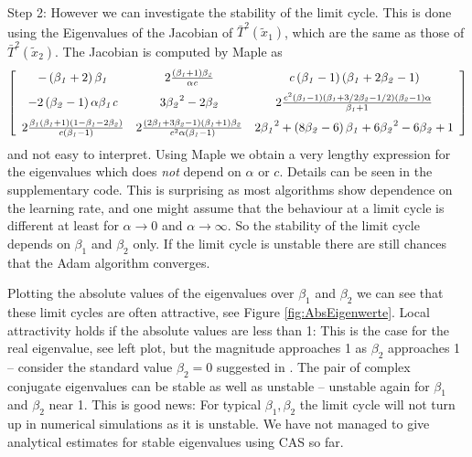 \documentclass[runningheads]{llncs}
\begin{document}
Step 2:
However we can investigate the stability of the limit cycle. This is done using
the Eigenvalues of the Jacobian of $\bar T^2(\tilde x_1)$, which are the same 
as those of $\bar T^2(\tilde x_2)$.
The Jacobian is computed by Maple as
\[
 \left[ \begin {array}{ccc} 
  - \left( {\it \beta_1}+2 \right) {\it \beta_1}&2{
\frac { \left( {\it \beta_1}+1 \right) {\it \beta_2}}{{\it \alpha}{\it c}}}&{\it 
c} \left( {\it \beta_1}-1 \right)  \left( {\it \beta_1}+2{\it \beta_2}-1
 \right) \\ \noalign{\medskip}-2 \left( {\it \beta_2}-1 \right) {\it \alpha}
{\it \beta_1}{\it c}&3{{\it \beta_2}}^{2}-2{\it \beta_2}&2{\frac {{{\it c
}}^{2} \left( {\it \beta_1}-1 \right)  \left( {\it \beta_1}+3/2{\it \beta_2}-1/2
 \right)  \left( {\it \beta_2}-1 \right) {\it \alpha}}{{\it \beta_1}+1}}
\\ \noalign{\medskip}2{\frac {{\it \beta_1} \left( {\it \beta_1}+1 \right) 
 \left( 1 - {\it \beta_1}-2{\it \beta_2} \right) }{{\it c} \left( {\it \beta_1}-1
 \right) }}&2{\frac { \left( 2{\it \beta_1}+3{\it \beta_2}-1 \right) 
 \left( {\it \beta_1}+1 \right) {\it \beta_2}}{{{\it c}}^{2}{\it \alpha} \left( {
\it \beta_1}-1 \right) }}&2{{\it \beta_1}}^{2}+ \left( 8{\it \beta_2}-6 \right) {
\it \beta_1}+6 {{\it \beta_2}}^{2}-6{\it \beta_2}+1
\end {array} \right] 
\]
and not easy to interpret.  
Using Maple we obtain a very lengthy expression for the eigenvalues which does 
{\em not} depend on $\alpha$ or $c$. Details can be seen in the supplementary code.
This is surprising as most algorithms show dependence on the learning rate,
and one might assume that the behaviour at a limit cycle is different at least for 
$\alpha\to 0$ and $\alpha\to \infty$.
So the stability of the limit cycle depends on $\beta_1$ and $\beta_2$ only.
If the limit cycle is unstable there are still chances that the Adam algorithm
converges. 

Plotting the absolute values of the eigenvalues over $\beta_1$ and $\beta_2$ we can see
that these limit cycles are often attractive, see Figure \ref{fig:AbsEigenwerte}. 
Local attractivity holds if the absolute values are less than 1: This is
the case for the real eigenvalue, see left plot, but the magnitude approaches 1 as  
$\beta_2$ approaches 1 -- consider the standard value $\beta_2=0$ suggested in 
\cite{Kingma.2014}. The pair of complex conjugate eigenvalues can be stable as well as
unstable -- unstable again for $\beta_1$ and $\beta_2$ near 1. This is good news:
For typical $\beta_1, \beta_2$ the limit cycle will not turn up in numerical simulations
as it is unstable.
We have not managed to give analytical estimates for stable eigenvalues using CAS so far.
\end{document}
